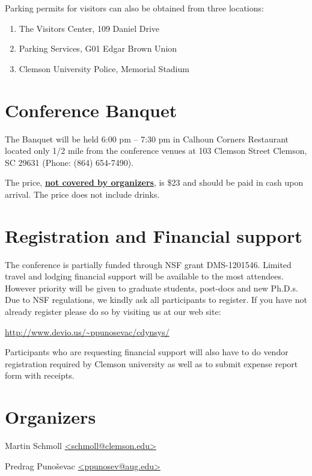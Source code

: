 \documentclass[a4paper,10pt,foldmark,notumble]{leaflet}
\begin{document}
Parking permits for visitors can also be obtained from three locations:
\begin{enumerate}
\item The Visitors Center, 109 Daniel Drive
\item Parking Services, G01 Edgar Brown Union
\item Clemson University Police, Memorial
Stadium
\end{enumerate}
\section{Conference Banquet}
The Banquet will be held 6:00 pm -- 7:30 pm in Calhoun Corners
Restaurant located only 1/2 mile from the conference venues at
103 Clemson Street
Clemson, SC 29631
(Phone: (864) 654-7490).


The price, \underline{\bf not covered by organizers}, is \$23 and should
be paid in cash upon arrival. The price does not include drinks.



\section{Registration and Financial support} The
conference is partially funded through NSF grant DMS-1201546.  Limited
travel and lodging financial support will be available to the most
attendees. However priority will be given to graduate students,
post-docs and new Ph.D.s. Due to NSF regulations, we kindly ask all
participants to register. If you have not already register please do so
by visiting us at our web site:

\url{http://www.devio.us/~ppunosevac/cdynsys/}


Participants who are requesting financial support will also have to do
vendor registration required by Clemson university as well as to submit
expense report form with receipts.

\section{Organizers}

Martin Schmoll \url{<schmoll@clemson.edu>}

Predrag Puno\v{s}evac \url{<ppunosev@aug.edu>}
\end{document}
